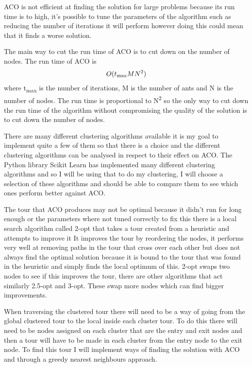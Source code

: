ACO is not efficient at finding the solution for large problems because its run time is to high, it's possible to tune the parameters of the algorithm such as reducing the number of iterations it will perform however doing this could mean that it finds a worse solution. 

The main way to cut the run time of ACO is to cut down on the number of nodes. The run time of ACO is \[O(t\textsubscript{max}MN^2)\] where t\textsubscript{max} is the number of iterations, M is the number of ants and N is the number of nodes\cite{pang_chao-yang_ben-qiong_zhang_jie_wei_shan_zheng-chao_2014}. The run time is proportional to N\textsuperscript{2} so the only way to cut down the run time of the algorithm without compromising the quality of the solution is to cut down the number of nodes.

There are many different clustering algorithms available it is my goal to implement quite a few of them so that there is a choice and the different clustering algorithms can be analysed in respect to their effect on ACO. The Python library Scikit Learn\cite{scikit_learn_python_library} has implemented many different clustering algorithms\cite{scikit_clustering} and so I will be using that to do my clustering, I will choose a selection of these algorithms and should be able to compare them to see which ones perform better against ACO.

The tour that ACO produces may not be optimal because it didn't run for long enough or the parameters where not tuned correctly to fix this there is a local search algorithm called 2-opt that takes a tour created from a heuristic and attempts to improve it\cite{venhuis_2019} It improves the tour by reordering the nodes, it performs very well at removing paths in the tour that cross over each other but does not always find the optimal solution because it is bound to the tour that was found in the heuristic and simply finds the local optimum of this. 2-opt swaps two nodes to see if this improves the tour, there are other algorithms that act similarly 2.5-opt and 3-opt. These swap more nodes which can find bigger improvements.

When traversing the clustered tour there will need to be a way of going from the global clustered tour to the local inside each cluster tour. To do this there will need to be nodes assigned on each cluster that are the entry and exit nodes and then a tour will have to be made in each cluster from the entry node to the exit node. To find this tour I will implement ways of finding the solution with ACO and through a greedy nearest neighbours approach.

